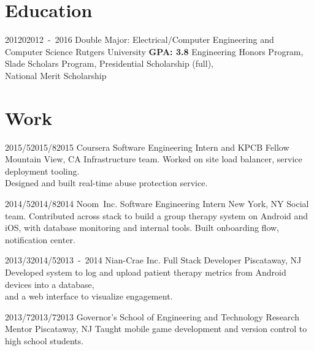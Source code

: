 \documentclass[11pt,letterpaper]{moderncv}
\begin{document}
\maketitle

\section{Education}

\tllabelcventry
    {2012}{0}{2012~-~2016}
    {Double Major: Electrical/Computer Engineering and Computer Science}
    {\break Rutgers University}
    {}
    {\textbf{GPA: 3.8}}
    {Engineering Honors Program, Slade Scholars Program, Presidential Scholarship (full),\\National Merit Scholarship}

\section{Work}

    \tllabelcventry
        {2015/5}{2015/8}{2015}
        {Coursera}
        {Software Engineering Intern and KPCB Fellow}
        {Mountain View, CA}
        {}
        {Infrastructure team. Worked on site load balancer, service deployment tooling. \\Designed and built real-time abuse protection service. \\}

    \tllabelcventry
        {2014/5}{2014/8}{2014}
        {Noom~Inc.}
        {Software Engineering Intern}
        {New York, NY}
        {}
        {Social team. Contributed across stack to build a group therapy system on Android and iOS, with database monitoring and internal tools. Built onboarding flow, notification center.\\}

    \tllabelcventry
        {2013/3}{2014/5}{2013~-~2014} %
        {Nian-Crae Inc.}
        {Full Stack Developer}
        {Piscataway, NJ}
        {}
        {Developed system to log and upload patient therapy metrics from Android devices into a database,\\and a web interface to visualize engagement.\\}

    \tllabelcventry
        {2013/7}{2013/7}{2013}
        {Governor's School of Engineering and Technology}
        {Research Mentor}
        {Piscataway, NJ}
        {}
        {Taught mobile game development and version control to high school students.}
\end{document}
